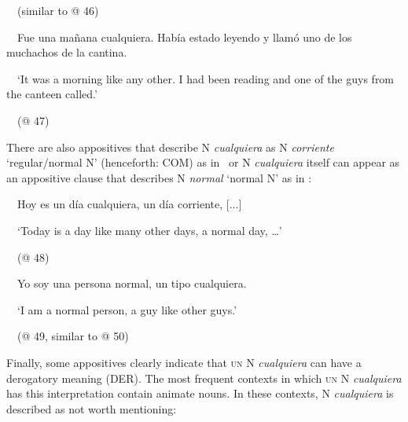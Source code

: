 \begin{styleStandard}
\ \ (similar to @ 46)
\end{styleStandard}

\begin{styleStandard}
\label{bkm:Ref42870616}\ \ Fue una mañana cualquiera. Había estado leyendo y llamó uno de los muchachos de la cantina.
\end{styleStandard}

\begin{styleStandard}
\ \ ‘It was a morning like any other. I had been reading and one of the guys from the canteen called.’
\end{styleStandard}

\begin{styleStandard}
\ \ (@ 47)
\end{styleStandard}

\begin{styleStandard}
There are also appositives that describe N \textit{cualquiera} as N\textit{ corriente} ‘regular/normal N’ (henceforth: COM) as in \ or N \textit{cualquiera} itself can appear as an appositive clause that describes N \textit{normal} ‘normal N’ as in :
\end{styleStandard}

\begin{styleStandard}
\label{bkm:Ref57554115}\ \ Hoy es un día cualquiera, un día corriente, [...]
\end{styleStandard}

\begin{styleStandard}
\ \ ‘Today is a day like many other days, a normal day, …’
\end{styleStandard}

\begin{styleStandard}
\ \ (@ 48)
\end{styleStandard}

\begin{styleStandard}
\label{bkm:Ref63545479}\ \ Yo soy una persona normal, un tipo cualquiera.
\end{styleStandard}

\begin{styleStandard}
\ \ ‘I am a normal person, a guy like other guys.’
\end{styleStandard}

\begin{styleStandard}
\ \ (@ 49, similar to @ 50)
\end{styleStandard}

\begin{styleStandard}
Finally, some appositives clearly indicate that \textsc{un} N \textit{cualquiera} can have a derogatory meaning (DER). The most frequent contexts in which \textsc{un} N \textit{cualquiera} has this interpretation contain animate nouns. In these contexts, N \textit{cualquiera} is described as not worth mentioning:
\end{styleStandard}

